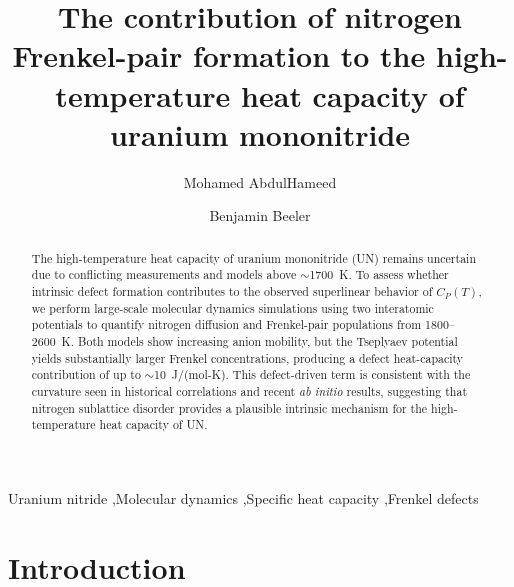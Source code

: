 \documentclass[preprint,12pt,sort&compress]{elsarticle}
\newcommand{\?}{\stackrel{?}{=}}
\begin{document}
\begin{frontmatter}

\title{The contribution of nitrogen Frenkel-pair formation to the high-temperature heat capacity of uranium mononitride}

\author[ncsu,unsw]{Mohamed AbdulHameed}
\author[ncsu,inl]{Benjamin Beeler}

\address[ncsu]{Department of Nuclear Engineering, North Carolina State University, Raleigh, NC 27695, USA}
\address[inl]{Idaho National Laboratory, Idaho Falls, ID 83415, USA}
\address[unsw]{School of Mechanical and Manufacturing Engineering, UNSW Sydney, Sydney, NSW 2052, Australia}


\begin{abstract}

The high-temperature heat capacity of uranium mononitride (UN) remains uncertain due to conflicting measurements and models above $\sim$1700~K. To assess whether intrinsic defect formation contributes to the observed superlinear behavior of $C_P(T)$, we perform large-scale molecular dynamics simulations using two interatomic potentials to quantify nitrogen diffusion and Frenkel-pair populations from 1800--2600~K. Both models show increasing anion mobility, but the Tseplyaev potential yields substantially larger Frenkel concentrations, producing a defect heat-capacity contribution of up to $\sim$10~J/(mol-K). This defect-driven term is consistent with the curvature seen in historical correlations and recent \textit{ab initio} results, suggesting that nitrogen sublattice disorder provides a plausible intrinsic mechanism for the high-temperature heat capacity of UN.

\end{abstract}

\begin{keyword}
Uranium nitride \sep Molecular dynamics \sep Specific heat capacity \sep Frenkel defects
\end{keyword}

\end{frontmatter}

\linenumbers

\section{Introduction}
\end{document}
